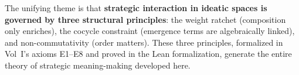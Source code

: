 The unifying theme is that \textbf{strategic interaction in ideatic spaces
is governed by three structural principles}: the weight ratchet (composition
only enriches), the cocycle constraint (emergence terms are algebraically
linked), and non-commutativity (order matters).  These three principles,
formalized in Vol~I's axioms E1--E8 and proved in the Lean formalization,
generate the entire theory of strategic meaning-making developed here.
